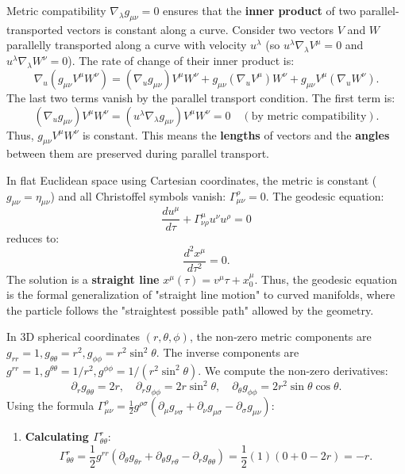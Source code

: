 \begin{solution}
\begin{example}
Metric compatibility $\nabla_\lambda g_{\mu\nu} = 0$ ensures that the \textbf{inner product} of two parallel-transported vectors is constant along a curve. Consider two vectors $V$ and $W$ parallelly transported along a curve with velocity $u^\lambda$ (so $u^\lambda \nabla_\lambda V^\mu = 0$ and $u^\lambda \nabla_\lambda W^\nu = 0$). The rate of change of their inner product is:
\[ \nabla_u (g_{\mu\nu} V^\mu W^\nu) = (\nabla_u g_{\mu\nu}) V^\mu W^\nu + g_{\mu\nu} (\nabla_u V^\mu) W^\nu + g_{\mu\nu} V^\mu (\nabla_u W^\nu). \]
The last two terms vanish by the parallel transport condition. The first term is:
\[ (\nabla_u g_{\mu\nu}) V^\mu W^\nu = (u^\lambda \nabla_\lambda g_{\mu\nu}) V^\mu W^\nu = 0 \quad (\text{by metric compatibility}). \]
Thus, $g_{\mu\nu} V^\mu W^\nu$ is constant. This means the \textbf{lengths} of vectors and the \textbf{angles} between them are preserved during parallel transport.
\end{example}

\begin{example}
In flat Euclidean space using Cartesian coordinates, the metric is constant ($g_{\mu\nu} = \eta_{\mu\nu}$) and all Christoffel symbols vanish: $\Gamma^\rho_{\mu\nu} = 0$. The geodesic equation:
\[ \frac{d u^\mu}{d\tau} + \Gamma^\mu_{\nu\rho} u^\nu u^\rho = 0 \]
reduces to:
\[ \frac{d^2 x^\mu}{d\tau^2} = 0. \]
The solution is a \textbf{straight line} $x^\mu(\tau) = v^\mu \tau + x_0^\mu$. Thus, the geodesic equation is the formal generalization of "straight line motion" to curved manifolds, where the particle follows the "straightest possible path" allowed by the geometry.
\end{example}

\begin{example}
In 3D spherical coordinates $(r, \theta, \phi)$, the non-zero metric components are $g_{rr}=1, g_{\theta\theta}=r^2, g_{\phi\phi}=r^2\sin^2\theta$. The inverse components are $g^{rr}=1, g^{\theta\theta}=1/r^2, g^{\phi\phi}=1/(r^2\sin^2\theta)$.
We compute the non-zero derivatives:
\[ \partial_r g_{\theta\theta} = 2r, \quad \partial_r g_{\phi\phi} = 2r \sin^2 \theta, \quad \partial_\theta g_{\phi\phi} = 2r^2 \sin\theta\cos\theta. \]
Using the formula $\Gamma^\rho_{\mu\nu} = \frac{1}{2} g^{\rho\sigma} (\partial_\mu g_{\nu\sigma} + \partial_\nu g_{\mu\sigma} - \partial_\sigma g_{\mu\nu})$:
\begin{enumerate}
    \item \textbf{Calculating $\Gamma^r_{\theta\theta}$}:
    \[ \Gamma^r_{\theta\theta} = \frac{1}{2} g^{rr} (\partial_\theta g_{\theta r} + \partial_\theta g_{r\theta} - \partial_r g_{\theta\theta}) = \frac{1}{2} (1) (0 + 0 - 2r) = -r. \]
    

\end{enumerate}
\end{example}
\end{solution}
